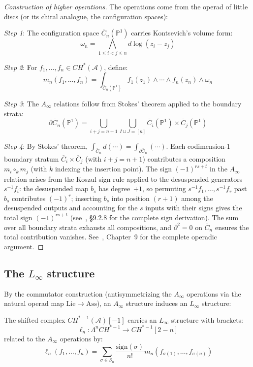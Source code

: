 \begin{proof}[Construction of higher operations]
The operations come from the operad of little discs (or its chiral analogue, the configuration spaces):

\emph{Step 1}: The configuration space $\overline{C}_n(\mathbb{P}^1)$ carries Kontsevich's volume form:
\[
\omega_n = \bigwedge_{1 \leq i < j \leq n} d\log(z_i - z_j)
\]

\emph{Step 2}: For $f_1, \ldots, f_n \in CH^*(\mathcal{A})$, define:
\[
m_n(f_1, \ldots, f_n) = \int_{\overline{C}_n(\mathbb{P}^1)} f_1(z_1) \wedge \cdots \wedge f_n(z_n) \wedge \omega_n
\]

\emph{Step 3}: The $A_\infty$ relations follow from Stokes' theorem applied to the boundary strata:
\[
\partial \overline{C}_n(\mathbb{P}^1) = \bigcup_{i+j=n+1} \bigcup_{I \sqcup J = [n]} \overline{C}_i(\mathbb{P}^1) \times \overline{C}_j(\mathbb{P}^1)
\]

\emph{Step 4}: By Stokes' theorem, $\int_{\overline{C}_n} d(\cdots) = \int_{\partial\overline{C}_n}(\cdots)$.  Each codimension-$1$ boundary stratum $\overline{C}_i \times \overline{C}_j$ (with $i + j = n + 1$) contributes a composition $m_i \circ_k m_j$ (with $k$ indexing the insertion point).  The sign $(-1)^{rs+t}$ in the $A_\infty$ relation arises from the Koszul sign rule applied to the desuspended generators $s^{-1}f_i$: the desuspended map $b_s$ has degree~$+1$, so permuting $s^{-1}f_1, \ldots, s^{-1}f_r$ past $b_s$ contributes $(-1)^r$; inserting $b_s$ into position $(r{+}1)$ among the desuspended outputs and accounting for the $s$ inputs with their signs gives the total sign $(-1)^{rs+t}$ (see~\cite{LV12}, \S9.2.8 for the complete sign derivation).  The sum over all boundary strata exhausts all compositions, and $\partial^2 = 0$ on $\overline{C}_n$ ensures the total contribution vanishes.  See~\cite{LodayVallette}, Chapter~9 for the complete operadic argument. \qedhere
\end{proof}

\subsection{\texorpdfstring{The $L_\infty$ structure}{The L-infinity structure}}

By the commutator construction (antisymmetrizing the $A_\infty$ operations via the natural operad map $\mathrm{Lie} \to \mathrm{Ass}$), an $A_\infty$ structure induces an $L_\infty$ structure:

\begin{theorem}
\label{thm:linfty-chiral-hochschild}
The shifted complex $CH^{*-1}(\mathcal{A})[-1]$ carries an $L_\infty$ structure with brackets:
\[
\ell_n: \Lambda^n CH^{*-1} \to CH^{*-1}[2-n]
\]
related to the $A_\infty$ operations by:
\[
\ell_n(f_1, \ldots, f_n) = \sum_{\sigma \in S_n} \frac{\text{sign}(\sigma)}{n!} m_n(f_{\sigma(1)}, \ldots, f_{\sigma(n)})
\]
\end{theorem}


